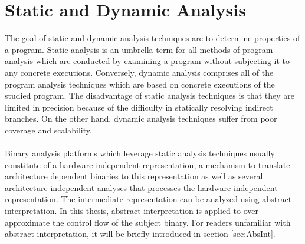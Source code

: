 \documentclass{kththesis}
\newcommand{\fbcomment}[1]{{#1}}
\renewcommand{\fbcomment}[1]{}
\begin{document}
\section{Static and Dynamic Analysis}
\fbcomment{\color{red}Goal: Explain challenges of static analysis. Also, pros and cons of using static and dynamic analysis}
The goal of static and dynamic analysis techniques are to determine properties of a program\cite{staticOfInd}. Static analysis is an umbrella term for all methods of program analysis which are conducted by examining a program without subjecting it to any concrete executions. Conversely, dynamic analysis comprises all of the program analysis techniques which are based on concrete executions of the studied program. The disadvantage of static analysis techniques is that they are limited in precision because of the difficulty in statically resolving indirect
branches\cite{preciseCFGBoolean}. On the other hand, dynamic analysis techniques suffer from poor coverage and scalability\cite{preciseCFGBoolean}.
\\ \\
Binary analysis platforms which leverage static analysis techniques usually constitute of a hardware-independent representation, a mechanism to translate architecture dependent binaries to this representation as well as several architecture independent analyses that processes the hardware-independent representation\cite{TrABin}. The intermediate representation can be analyzed using abstract interpretation\cite{Jakstab}. In this thesis, abstract interpretation is applied to over-approximate the control flow of the subject binary. For readers unfamiliar with abstract interpretation, it will be briefly introduced in section \ref{sec:AbsInt}.
\end{document}
